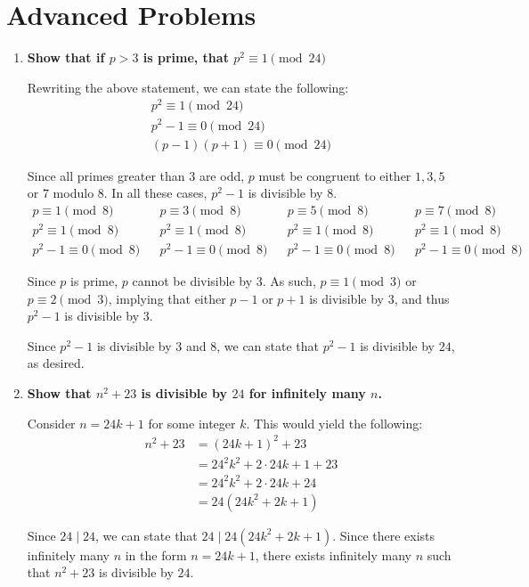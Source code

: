 \documentclass[12pt]{article}
\newcommand{\tdiv}{\; | \;}
\begin{document}
\section*{Advanced Problems}
\begin{enumerate}
    \item \textbf{Show that if $p > 3$ is prime, that $p^2 \equiv 1 \pmod{24}$}
    
    Rewriting the above statement, we can state the following:
    \begin{align*}
        p^2 \equiv 1 \pmod{24} \\
        p^2 - 1 \equiv 0 \pmod{24} \\
        (p - 1)(p + 1) \equiv 0 \pmod{24}
    \end{align*}
    
    Since all primes greater than $3$ are odd, $p$ must be congruent to either $1, 3, 5$ or $7$ modulo $8$. In all these cases, $p^2 - 1$ is divisible by $8$.
    \begin{align*}
        p \equiv 1 \pmod{8} && p \equiv 3 \pmod{8} && p \equiv 5 \pmod{8} && p \equiv 7 \pmod{8} \\
        p^2 \equiv 1 \pmod{8} && p^2 \equiv 1 \pmod{8} && p^2 \equiv 1 \pmod{8} && p^2 \equiv 1 \pmod{8} \\
        p^2 - 1 \equiv 0 \pmod{8} && p^2 - 1 \equiv 0 \pmod{8} && p^2 - 1 \equiv 0 \pmod{8} && p^2 - 1 \equiv 0 \pmod{8} 
    \end{align*}
    
    Since $p$ is prime, $p$ cannot be divisible by $3$. As such, $p \equiv 1 \pmod{3}$ or $p \equiv 2 \pmod{3}$, implying that either $p - 1$ or $p + 1$ is divisible by $3$, and thus $p^2 - 1$ is divisible by $3$.
    
    Since $p^2 - 1$ is divisible by $3$ and $8$, we can state that $p^2 - 1$ is divisible by $24$, as desired.
    
    \item \textbf{Show that $n^2 + 23$ is divisible by $24$ for infinitely many $n$.}
    
    Consider $n = 24k + 1$ for some integer $k$. This would yield the following:
    \begin{align*}
        n^2 + 23 &= (24k + 1)^2 + 23 \\
                &= 24^2k^2 + 2\cdot 24k + 1 + 23 \\
                &= 24^2k^2 + 2\cdot 24k + 24 \\
                &= 24(24k^2 + 2k + 1)
    \end{align*}
    
    Since $24 \tdiv 24$, we can state that $24 \tdiv 24(24k^2 + 2k + 1)$. Since there exists infinitely many $n$ in the form $n = 24k + 1$, there exists infinitely many $n$ such that $n^2 + 23$ is divisible by $24$.
    
\end{enumerate}
\end{document}
